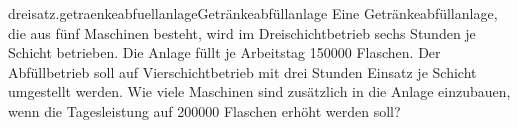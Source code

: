 \begin{exercise}{dreisatz.getraenkeabfuellanlage}{Getränkeabfüllanlage}
  \ifproblem\problem
    Eine Getränkeabfüllanlage, die aus fünf Maschinen besteht, wird im
    Dreischichtbetrieb sechs Stunden je Schicht betrieben. Die Anlage füllt
    je Arbeitstag \num{150000} Flaschen. Der Abfüllbetrieb soll auf Vierschichtbetrieb
    mit drei Stunden Einsatz je Schicht umgestellt werden. Wie viele Maschinen
    sind zusätzlich in die Anlage einzubauen, wenn die Tagesleistung auf \num{200000}
    Flaschen erhöht werden soll?
  \fi
\end{exercise}
